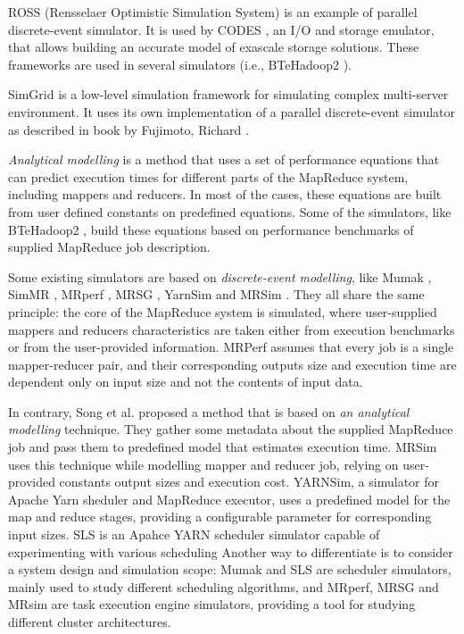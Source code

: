 \documentclass[conference]{IEEEtran} \IEEEoverridecommandlockouts
\begin{document}
    ROSS \cite{ross} (Rensselaer Optimistic Simulation System) is an example of
    parallel discrete-event simulator. It is used by CODES \cite{codes}, an I/O
    and storage emulator, that allows building an accurate model of exascale
    storage solutions. These frameworks are used in several simulators (i.e.,
    BTeHadoop2 \cite{baseline_model}).

    SimGrid \cite{simgrid} is a low-level simulation framework for simulating
    complex multi-server environment. It uses its own implementation of a
    parallel discrete-event simulator as described in book by Fujimoto, Richard
    \cite{fujimoto_parallel_1990}.

    \textit{Analytical modelling} is a method that uses a set of performance
    equations that can predict execution times for different parts of the
    MapReduce system, including mappers and reducers. In most of the cases,
    these equations are built from user defined constants on predefined
    equations. Some of the simulators, like BTeHadoop2 \cite{baseline_model},
    build these equations based on performance benchmarks of supplied MapReduce
    job description.

    Some existing simulators are based on \textit{discrete-event modelling},
    like Mumak \cite{mumak}, SimMR \cite{simmr}, MRperf \cite{mrperf}, MRSG
    , YarnSim \cite{yarnsim} and MRSim \cite{mrsim}. They all share
    the same principle: the core of the MapReduce system is simulated, where
    user-supplied mappers and reducers characteristics are taken either from
    execution benchmarks or from the user-provided information. MRPerf assumes
    that every job is a single mapper-reducer pair, and their corresponding
    outputs size and execution time are dependent only on input size and not
    the contents of input data. 

    In contrary, Song et al. \cite{song} proposed a method that is based on
    \textit{an analytical modelling} technique. They gather some metadata about
    the supplied MapReduce job and pass them to predefined model that estimates
    execution time. MRSim uses this technique while modelling mapper and
    reducer job, relying on user-provided constants output sizes and execution
    cost. YARNSim, a simulator for Apache Yarn \cite{apache_yarn} sheduler and
    MapReduce executor, uses a predefined model for the map and reduce stages,
    providing a configurable parameter for corresponding input sizes. SLS
    \cite{sls} is an Apahce YARN scheduler simulator capable of experimenting
    with various scheduling Another way to differentiate is to consider a
    system design and simulation scope: Mumak and SLS\cite{sls} are scheduler
    simulators, mainly used to study different scheduling algorithms, and
    MRperf, MRSG and MRsim are task execution engine simulators, providing a
    tool for studying different cluster architectures.
\end{document}
